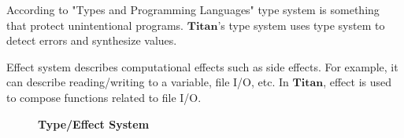 \documentclass[12pt, a4paper, titlepage]{report}
\begin{document}
      According to "Types and Programming Languages" \cite{pierce:2002} type system is something that protect unintentional programs.
      $\mathbf{Titan}$'s type system uses type system to detect errors and synthesize values.

      Effect system describes computational effects such as side effects.
      For example, it can describe reading/writing to a variable, file I/O, etc.
      In $\mathbf{Titan}$, effect is used to compose functions related to file I/O.

      \begin{figure}[htbp]
        \begin{flushleft}
          \textbf{Type/Effect System} \quad {}
        \end{flushleft}
        \centering
\end{figure}
\end{document}
